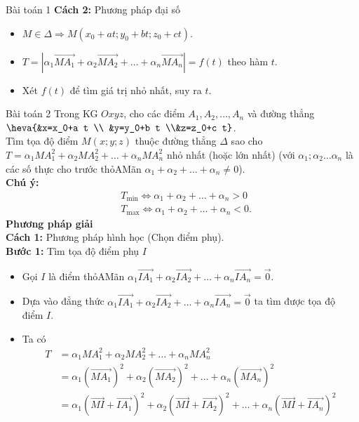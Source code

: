 \begin{dang}{Bài toán 1}
\textbf{Cách 2:} Phương pháp đại số
\begin{itemize}
	\item $M \in \Delta \Rightarrow M\left(x_0+a t ; y_0+b t ; z_0+c t\right)$.
	\item $T=\left|\alpha_1 \vec{MA_1}+\alpha_2 \vec{MA_2}+\ldots+\alpha_n \vec{MA_n}\right|=f(t)$ theo hàm $t$.
	\item Xét $f(t)$ để tìm giá trị nhỏ nhất, suy ra $t$.
\end{itemize}
\end{dang}

\begin{dang}{Bài toán 2}
Trong KG $Oxyz$, cho các điểm $A_1, A_2, \ldots, A_n$ và đường thẳng
$\heva{&x=x_0+a t \\ &y=y_0+b t \\&z=z_0+c t}$.
\\
Tìm tọa độ điểm $M(x ; y ; z)$ thuộc đường thẳng $\Delta$ sao cho $T=\alpha_1 MA_1^2+\alpha_2 MA_2^2+\ldots+\alpha_n MA_n^2$ nhỏ nhất (hoặc lớn nhất) (với $\alpha_1 ; \alpha_2 \ldots \alpha_n$ là các số thực cho trước thỏAMãn $\alpha_1+\alpha_2+\ldots+\alpha_n \neq 0$).
\\
\textbf{Chú ý:}
\begin{align*}
	& T_{\min } \Leftrightarrow \alpha_1+\alpha_2+\ldots+\alpha_n>0 \\
	& T_{\max } \Leftrightarrow \alpha_1+\alpha_2+\ldots+\alpha_n<0.
\end{align*}
\textbf{Phương pháp giải}
\\
\textbf{Cách 1:} Phương pháp hình học (Chọn điểm phụ).
\\
\textbf{Bước 1:} Tìm tọa độ điểm phụ $I$
\begin{itemize}
	\item Gọi $I$ là điểm thỏAMãn $\alpha_1 \vec{IA_1}+\alpha_2 \vec{IA_2}+\ldots+\alpha_n \vec{IA_n}=\vec{0}$.
	\item Dựa vào đẳng thức $\alpha_1 \vec{IA_1}+\alpha_2 \vec{IA_2}+\ldots+\alpha_n \vec{IA_n}=\vec{0}$ ta tìm được tọa độ điểm $I$.
	\item Ta có
	\begin{align*}
		T & =\alpha_1 MA_1^2+\alpha_2 MA_2^2+\ldots+\alpha_n MA_n^2 \\
		& =\alpha_1\left(\vec{MA_1}\right)^2+\alpha_2\left(\vec{MA_2}\right)^2+\ldots+\alpha_n\left(\vec{MA_n}\right)^2 \\
		& =\alpha_1\left(\vec{MI}+\vec{IA_1}\right)^2+\alpha_2\left(\vec{MI}+\vec{IA_2}\right)^2+\ldots+\alpha_n\left(\vec{MI}+\vec{IA_n}\right)^2 \\

\end{align*}
\end{itemize}
\end{dang}
